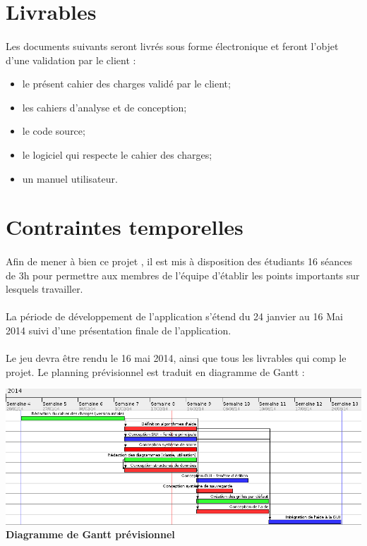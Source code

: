 \section {Livrables}
        \paragraph*{}
        Les documents suivants seront livrés sous forme électronique et feront l'objet d'une validation par le client :
        \begin{itemize}
                \item le présent cahier des charges validé par le client;
                \item les cahiers d'analyse et de conception;
                \item le code source;
                \item le logiciel qui respecte le cahier des charges;
                \item un manuel utilisateur.
        \end{itemize}


\section{Contraintes temporelles}
        \paragraph*{}
        Afin de mener à bien ce projet , il est mis à disposition des étudiants 16 séances de 3h pour permettre aux membres de l'équipe d'établir les points importants sur lesquels travailler.
        \paragraph*{}
        La période de développement de l’application s’étend du 24 janvier au 16 Mai 2014 suivi d’une présentation finale de l’application. %
        \paragraph*{}
        Le jeu devra être rendu le 16 mai 2014, ainsi que tous les livrables qui comp le projet.
        Le planning prévisionnel est traduit en diagramme de Gantt :\\

        \begin{center}
                \includegraphics[scale=.6, angle=90]{data/ganttDiagram.png}\\
                \textbf{Diagramme de Gantt prévisionnel}
        \end{center}


